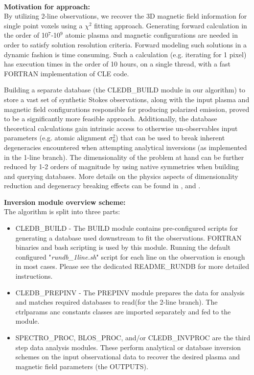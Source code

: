 \documentclass{article}
\begin{document}
~

\textbf{Motivation for approach:\\}
By utilizing 2-line observations, we recover the 3D magnetic field information for single point voxels using a $\chi^2$ fitting approach. Generating forward calculation in the order of 10$^7$-10$^9$ atomic plasma and magnetic configurations are needed in order to satisfy solution resolution criteria. Forward modeling such solutions in a dynamic fashion is time consuming. Such a calculation (e.g. iterating for 1 pixel) has execution times in the order of 10 hours, on a single thread, with a fast FORTRAN implementation of CLE code. 

Building a separate database (the CLEDB\_BUILD module in our algorithm) to store a vast set of synthetic Stokes observations, along with the input plasma and magnetic field configurations responsible for producing polarized emission, proved to be a significantly more feasible approach. Additionally, the database theoretical calculations gain intrinsic access to otherwise un-observables input parameters (e.g. atomic alignment $\sigma_0^2$) that can be used to break inherent degeneracies encountered when attempting analytical inversions (as implemented in the 1-line branch). The dimensionality of the problem at hand can be further reduced by 1-2 orders of magnitude by using native symmetries when building and querying databases. More details on the physics aspects of dimensionality reduction and degeneracy breaking effects can be found in \citet{2020ApJ...889..109D,2021ApJ...912...18J}, and \citet{par2021}.

\newpage



\textbf{Inversion module overview scheme:\\} 
The algorithm is split into three parts: 
\begin{itemize} 
\item CLEDB\_BUILD - The BUILD module contains pre-configured scripts for generating a database used downstream to fit the observations. FORTRAN binaries and bash scripting is used by this module. Running the default configured "\emph{rundb\_1line.sh}" script for each line on the observation is enough in most cases. Please see the dedicated README\_RUNDB for more detailed instructions.
 
\item CLEDB\_PREPINV - The PREPINV module prepares the data for analysis and matches required databases to read(for the 2-line branch). The ctrlparams anc constants classes are imported separately and fed to the module.

\item  SPECTRO\_PROC, BLOS\_PROC, and/or CLEDB\_INVPROC are the third step data analysis modules. These perform analytical or database inversion schemes on the input observational data to recover the desired plasma and magnetic field parameters (the OUTPUTS).
\end{itemize} 
\end{document}
